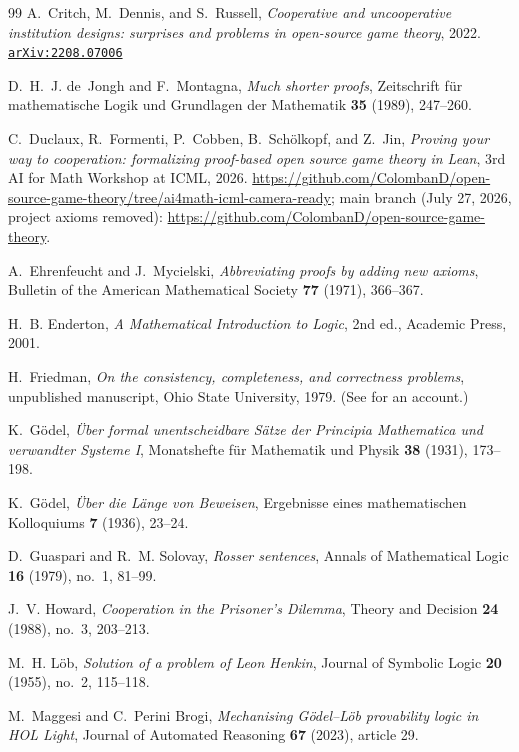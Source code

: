 \documentclass[11pt]{amsart}
\newcommand{\arxiv}[1]{\href{https://arxiv.org/abs/#1}{\texttt{arXiv:#1}}}
\theoremstyle{plain}
\theoremstyle{definition}
\begin{document}
\begin{thebibliography}{99}
A.~Critch, M.~Dennis, and S.~Russell,
\emph{Cooperative and uncooperative institution designs: surprises and problems in open-source game theory},
2022. \arxiv{2208.07006}

D.~H.~J. de~Jongh and F.~Montagna,
\emph{Much shorter proofs},
Zeitschrift f\"ur mathematische Logik und Grundlagen der Mathematik \textbf{35} (1989), 247--260.

C.~Duclaux, R.~Formenti, P.~Cobben, B.~Sch\"olkopf, and Z.~Jin,
\emph{Proving your way to cooperation: formalizing proof-based open source game theory in Lean},
3rd AI for Math Workshop at ICML, 2026.
\url{https://github.com/ColombanD/open-source-game-theory/tree/ai4math-icml-camera-ready}; main branch (July 27, 2026, project axioms removed): \url{https://github.com/ColombanD/open-source-game-theory}.

A.~Ehrenfeucht and J.~Mycielski,
\emph{Abbreviating proofs by adding new axioms},
Bulletin of the American Mathematical Society \textbf{77} (1971), 366--367.

H.~B. Enderton,
\emph{A Mathematical Introduction to Logic},
2nd ed., Academic Press, 2001.

H.~Friedman,
\emph{On the consistency, completeness, and correctness problems},
unpublished manuscript, Ohio State University, 1979. (See \cite{pudlak2017} for an account.)

K.~G\"odel,
\emph{\"Uber formal unentscheidbare S\"atze der Principia Mathematica und verwandter Systeme I},
Monatshefte f\"ur Mathematik und Physik \textbf{38} (1931), 173--198.

K.~G\"odel,
\emph{\"Uber die L\"ange von Beweisen},
Ergebnisse eines mathematischen Kolloquiums \textbf{7} (1936), 23--24.

D.~Guaspari and R.~M. Solovay,
\emph{Rosser sentences},
Annals of Mathematical Logic \textbf{16} (1979), no.~1, 81--99.

J.~V. Howard,
\emph{Cooperation in the Prisoner's Dilemma},
Theory and Decision \textbf{24} (1988), no.~3, 203--213.

M.~H. L\"ob,
\emph{Solution of a problem of Leon Henkin},
Journal of Symbolic Logic \textbf{20} (1955), no.~2, 115--118.

M.~Maggesi and C.~Perini Brogi,
\emph{Mechanising G\"odel--L\"ob provability logic in HOL Light},
Journal of Automated Reasoning \textbf{67} (2023), article 29.


\end{thebibliography}
\end{document}
